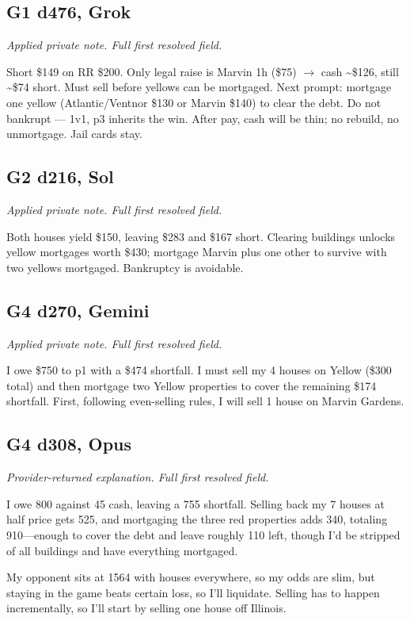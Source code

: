 \subsection*{G1 d476, Grok}
{\small\textit{Applied private note. Full first resolved field.}\par Short \$149 on RR \$200. Only legal raise is Marvin 1h (\$75) \ensuremath{\rightarrow} cash \textasciitilde{}\$126, still \textasciitilde{}\$74 short. Must sell before yellows can be mortgaged. Next prompt: mortgage one yellow (Atlantic/Ventnor \$130 or Marvin \$140) to clear the debt. Do not bankrupt — 1v1, p3 inherits the win. After pay, cash will be thin; no rebuild, no unmortgage. Jail cards stay.\par}
\subsection*{G2 d216, Sol}
{\small\textit{Applied private note. Full first resolved field.}\par Both houses yield \$150, leaving \$283 and \$167 short. Clearing buildings unlocks yellow mortgages worth \$430; mortgage Marvin plus one other to survive with two yellows mortgaged. Bankruptcy is avoidable.\par}
\subsection*{G4 d270, Gemini}
{\small\textit{Applied private note. Full first resolved field.}\par I owe \$750 to p1 with a \$474 shortfall. I must sell my 4 houses on Yellow (\$300 total) and then mortgage two Yellow properties to cover the remaining \$174 shortfall. First, following even-selling rules, I will sell 1 house on Marvin Gardens.\par}
\subsection*{G4 d308, Opus}
{\small\textit{Provider-returned explanation. Full first resolved field.}\par I owe 800 against 45 cash, leaving a 755 shortfall. Selling back my 7 houses at half price gets 525, and mortgaging the three red properties adds 340, totaling 910—enough to cover the debt and leave roughly 110 left, though I'd be stripped of all buildings and have everything mortgaged.

My opponent sits at 1564 with houses everywhere, so my odds are slim, but staying in the game beats certain loss, so I'll liquidate. Selling has to happen incrementally, so I'll start by selling one house off Illinois.\par}
